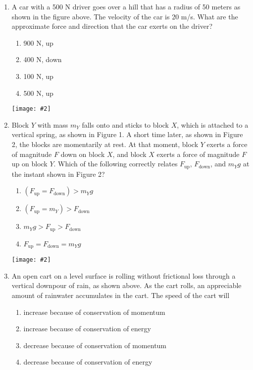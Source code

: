 \documentclass[11pt]{article}
\newcommand{\pic}[2]{\texttt{[image: \#2]}}
\begin{document}
\begin{multicols}{2}
\begin{enumerate}[leftmargin=18pt]
    \begin{center}
      \pic{.3}{IMG_20200810_093039201}
    \end{center}
  \item A car with a 500 N driver goes over a hill that has a radius of 50
    meters as shown in the figure above. The velocity of the car is 20 m/s.
    What are the approximate force and direction that the car exerts on the
    driver?
    \begin{enumerate}[nosep,leftmargin=18pt,label=(\Alph*)]
    \item 900 N, up
    \item 400 N, down
    \item 100 N, up
    \item 500 N, up
    \end{enumerate}
    \columnbreak
    
    \begin{center}
      \pic{.27}{falling-blocks}
    \end{center}
  \item Block $Y$ with mass $m_Y$ falls onto and sticks to block $X$, which is
    attached to a vertical spring, as shown in Figure 1. A short time later, as
    shown in Figure 2, the blocks are momentarily at rest. At that moment,
    block $Y$ exerts a force of magnitude $F$ down on block $X$, and block $X$
    exerts a force of magnitude $F$ up on block $Y$. Which of the following
    correctly relates $F_\text{up}$, $F_\text{down}$, and $m_Yg$ at the
    instant shown in Figure 2?
    \begin{enumerate}[nosep,leftmargin=18pt,label=(\Alph*)]
    \item$\left(F_\mathrm{up}=F_\mathrm{down}\right)>m_Yg$
    \item$\left(F_\mathrm{up}=m_Y\right)>F_\mathrm{down}$
    \item$m_Yg > F_\mathrm{up} > F_\mathrm{down}$
    \item$F_\mathrm{up}=F_\mathrm{down}=m_Yg$
    \end{enumerate}
    \vspace{.7in}
    
    \begin{center}
      \pic{.35}{downpour}
    \end{center}
  \item An open cart on a level surface is rolling without frictional loss
    through a vertical downpour of rain, as shown above. As the cart rolls,
    an appreciable amount of rainwater accumulates in the cart. The speed of
    the cart will
    \begin{enumerate}[nosep,leftmargin=18pt,label=(\Alph*)]
    \item increase because of conservation of momentum
    \item increase because of conservation of energy
    \item decrease because of conservation of momentum
    \item decrease because of conservation of energy
    \end{enumerate}
    \columnbreak


\end{enumerate}
\end{multicols}
\end{document}
